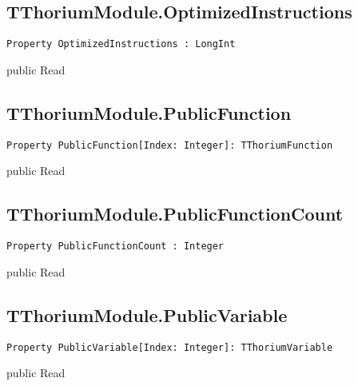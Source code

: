 \subsection{TThoriumModule.OptimizedInstructions}
\label{thoriumcore:thorium:tthoriummodule:optimizedinstructions}
\begin{FPCList}
\Synopsis
\Declaration 

\begin{verbatim}
Property OptimizedInstructions : LongInt
\end{verbatim}
\Visibility
public
\Access
Read
\Description
\end{FPCList}
\subsection{TThoriumModule.PublicFunction}
\label{thoriumcore:thorium:tthoriummodule:publicfunction}
\begin{FPCList}
\Synopsis
\Declaration 

\begin{verbatim}
Property PublicFunction[Index: Integer]: TThoriumFunction
\end{verbatim}
\Visibility
public
\Access
Read
\Description
\end{FPCList}
\subsection{TThoriumModule.PublicFunctionCount}
\label{thoriumcore:thorium:tthoriummodule:publicfunctioncount}
\begin{FPCList}
\Synopsis
\Declaration 

\begin{verbatim}
Property PublicFunctionCount : Integer
\end{verbatim}
\Visibility
public
\Access
Read
\Description
\end{FPCList}
\subsection{TThoriumModule.PublicVariable}
\label{thoriumcore:thorium:tthoriummodule:publicvariable}
\begin{FPCList}
\Synopsis
\Declaration 

\begin{verbatim}
Property PublicVariable[Index: Integer]: TThoriumVariable
\end{verbatim}
\Visibility
public
\Access
Read
\Description
\end{FPCList}
